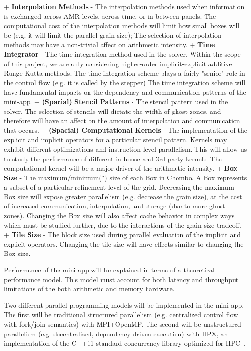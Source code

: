 \documentclass[final,letterpaper,10pt]{article}
\begin{document}
+ \textbf{Interpolation Methods} - The interpolation methods used when information is exchanged across AMR levels, across time, or in between panels. The computational cost of the interpolation methods will limit how small boxes will be (e.g. it will limit the parallel grain size); The selection of interpolation methods may have a non-trivial affect on arithmetic intensity. 
+ \textbf{Time Integrator} - The time integration method used in the solver. Within the scope of this project, we are only considering higher-order implicit-explicit additive Runge-Kutta methods. The time integration scheme plays a fairly "senior" role in the control flow (e.g. it is called by the stepper) The time integration scheme will have fundamental impacts on the dependency and communication patterns of the mini-app. 
+ \textbf{(Spacial) Stencil Patterns} - The stencil pattern used in the solver. The selection of stencils will dictate the width of ghost zones, and therefore will have an affect on the amount of interpolation and communication that occurs. 
+ \textbf{(Spacial) Computational Kernels} - The implementation of the explicit and implicit operators for a particular stencil pattern. Kernels may exhibit different optimizations and instruction-level parallelism. This will allow us to study the performance of different in-house and 3rd-party kernels. The computational kernel will be a major driver of the arithmetic intensity. 
+ \textbf{Box Size} - The maximum/minimum(?) size of each Box in Chombo. A Box represents a subset of a particular refinement level of the grid. Decreasing the maximum Box size will expose greater parallelism (e.g. decrease the grain size), at the cost of increased communication, interpolation, and storage (due to more ghost zones). Changing the Box size will also affect cache behavior in complex ways which must be studied further, due to the interactions of the grain size tradeoff. 
+ \textbf{Tile Size} - The block size used during parallel evaluation of the implicit and explicit operators. Changing the tile size will have effects similar to changing the Box size. 

Performance of the mini-app will be explained in terms of a theoretical
performance model. This model must account for both latency and throughput
limitations of the both arithmetic and memory hardware. 

Two different parallel programming models will be implemented in the mini-app.
The first will be traditional structured parallelism (e.g. centralized control
flow with fork/join semantics) with MPI+OpenMP. The second will be unstructured
parallelism (e.g. decentralized, dependency driven execution) with HPX, an
implementation of the C++11 standard concurrency library optimized for
HPC~\cite{iso_iec_14882:2011}.
\end{document}
